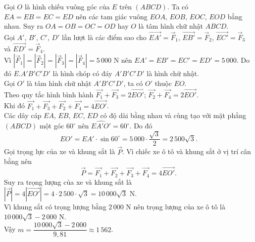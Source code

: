 \begin{bt}
{\begin{center}
		\end{center}
		Gọi $O$ là hình chiếu vuông góc của $E$ trên $(ABCD)$. Ta có $EA=EB=EC=ED$ nên các tam giác vuông $EOA$, $EOB$, $EOC$, $EOD$ bằng nhau. Suy ra $OA=OB=OC=OD$ hay $O$ là tâm hình chữ nhật $ABCD$.\\ 
		Gọi $A'$, $B'$, $C'$, $D'$ lần lượt là các điểm sao cho $\overrightarrow{EA'}=\overrightarrow{F}_1$, $\overrightarrow{EB'}=\overrightarrow{F}_2$, $\overrightarrow{EC'}=\overrightarrow{F}_3$ và $\overrightarrow{ED'}=\overrightarrow{F}_4$.\\
		Vì $\left|\overrightarrow{F}_1\right| = \left|\overrightarrow{F}_2\right| = \left|\overrightarrow{F}_3\right| = \left|\overrightarrow{F}_4\right| = 5\,000$ N nên $EA'=EB'=EC'=ED'=5\,000$. Do đó $E.A'B'C'D'$ là hình chóp có đáy $A'B'C'D'$ là hình chữ nhật.\\
		Gọi $O'$ là tâm hình chữ nhật $A'B'C'D'$, ta có $O'$ thuộc $EO$.\\ 
		Theo quy tắc hình bình hành $\overrightarrow{F_1}+\overrightarrow{F_3}=2\overrightarrow{EO'}$; $\overrightarrow{F_2}+\overrightarrow{F_4}=2\overrightarrow{EO'}$.\\
		Khi đó
		$\overrightarrow{F_1}+\overrightarrow{F_3}+\overrightarrow{F_2}+\overrightarrow{F_4}=4\overrightarrow{EO'}$.\\
		Các dây cáp $EA$, $EB$, $EC$, $ED$ có độ dài bằng nhau và cùng tạo với mặt phẳng $(ABCD)$ một góc $60^\circ$ nên $\widehat{EA'O'}=60^\circ$. Do đó\\
		\[EO'=EA'\cdot\sin 60^\circ=5\, 000\cdot\dfrac{\sqrt{3}}{2}=2\, 500\sqrt{3}.\]
		Gọi trọng lực của xe và khung sắt là $\overrightarrow{P}$. Vì chiếc xe ô tô và khung sắt ở vị trí cân bằng nên 
		\[\overrightarrow{P}=\overrightarrow{F_1}+\overrightarrow{F_2}+\overrightarrow{F_3}+\overrightarrow{F_4} = 4\overrightarrow{EO'}.\]
		Suy ra trọng lượng của xe và khung sắt là $\left|\overrightarrow{P}\right| = 4\left|\overrightarrow{EO'}\right| = 4\cdot 2\,500\cdot \sqrt{3} = 10\,000\sqrt{3}$ N.\\
		Vì khung sắt có trọng lượng bằng $2\,000$ N nên trọng lượng của xe ô tô là $10\,000\sqrt{3}-2\,000$ N.\\
		Vậy $m=\dfrac{10\,000\sqrt{3}-2\,000}{9{,}81}\approx 1\,562$.
	}
\end{bt}

